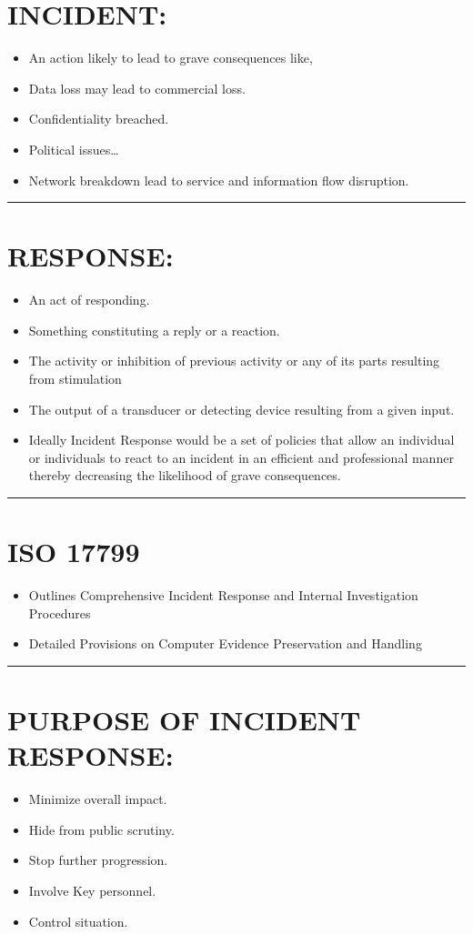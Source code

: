\documentclass[10pt,british,english]{article}
\begin{document}
\section{INCIDENT: }
\begin{itemize}
\item An action likely to lead to grave consequences like,
\item Data loss may lead to commercial loss.
\item Confidentiality breached.
\item Political issues\dots{}
\item Network breakdown lead to service and information flow disruption.
\end{itemize}
\rule[0.5ex]{1\columnwidth}{1pt}

\section{RESPONSE: }
\begin{itemize}
\item An act of responding.
\item Something constituting a reply or a reaction.
\item The activity or inhibition of previous activity or any of its parts
resulting from stimulation
\item The output of a transducer or detecting device resulting from a given
input.
\item Ideally Incident Response would be a set of policies that allow an
individual or individuals to react to an incident in an efficient
and professional manner thereby decreasing the likelihood of grave
consequences.
\end{itemize}
\rule[0.5ex]{1\columnwidth}{1pt}

\section{ISO 17799 }
\begin{itemize}
\item Outlines Comprehensive Incident Response and Internal Investigation
Procedures
\item Detailed Provisions on Computer Evidence Preservation and Handling 
\end{itemize}
\rule[0.5ex]{1\columnwidth}{1pt}

\section{PURPOSE OF INCIDENT RESPONSE:}
\begin{itemize}
\item Minimize overall impact.
\item Hide from public scrutiny.
\item Stop further progression.
\item Involve Key personnel.
\item Control situation.
\end{itemize}
%
\end{document}
